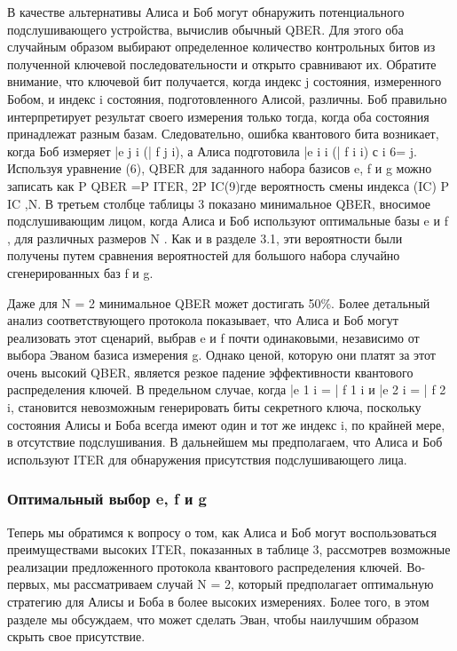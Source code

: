 В качестве альтернативы Алиса и Боб могут обнаружить потенциального подслушивающего устройства, вычислив обычный QBER. Для этого оба случайным образом выбирают определенное количество контрольных битов из полученной ключевой последовательности и открыто сравнивают их. Обратите внимание, что ключевой бит получается, когда индекс j состояния, измеренного Бобом, и индекс i состояния, подготовленного Алисой, различны. Боб правильно интерпретирует результат своего измерения только тогда, когда оба состояния принадлежат разным базам. Следовательно, ошибка квантового бита возникает, когда Боб измеряет |e j i (| f j i), а Алиса подготовила |e i i (| f i i) с i 6= j. Используя уравнение (6), QBER для заданного набора базисов e, f и g можно записать как P QBER =P ITER, 2P IC(9)где вероятность смены индекса (IC) P IC ,N. В третьем столбце таблицы 3 показано минимальное QBER, вносимое подслушивающим лицом, когда Алиса и Боб используют оптимальные базы e и f , для различных размеров N . Как и в разделе 3.1, эти вероятности были получены путем сравнения вероятностей для большого набора случайно сгенерированных баз f и g.

Даже для N = 2 минимальное QBER может достигать 50\%. Более детальный анализ соответствующего протокола показывает, что Алиса и Боб могут реализовать этот сценарий, выбрав e и f почти одинаковыми, независимо от выбора Эваном базиса измерения g. Однако ценой, которую они платят за этот очень высокий QBER, является резкое падение эффективности квантового распределения ключей. В предельном случае, когда |e 1 i = | f 1 i и |e 2 i = | f 2 i, становится невозможным генерировать биты секретного ключа, поскольку состояния Алисы и Боба всегда имеют один и тот же индекс i, по крайней мере, в отсутствие подслушивания. В дальнейшем мы предполагаем, что Алиса и Боб используют ITER для обнаружения присутствия подслушивающего лица.

\subsubsection{Оптимальный выбор e, f и g}

Теперь мы обратимся к вопросу о том, как Алиса и Боб могут воспользоваться преимуществами высоких ITER, показанных в таблице 3, рассмотрев возможные реализации предложенного протокола квантового распределения ключей. Во-первых, мы рассматриваем случай N = 2, который предполагает оптимальную стратегию для Алисы и Боба в более высоких измерениях. Более того, в этом разделе мы обсуждаем, что может сделать Эван, чтобы наилучшим образом скрыть свое присутствие.

